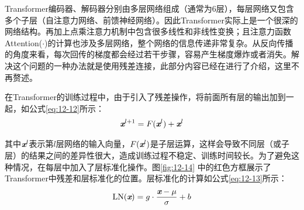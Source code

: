 \parinterval Transformer编码器、解码器分别由多层网络组成（通常为6层），每层网络又包含多个子层（自注意力网络、前馈神经网络）。因此Transformer实际上是一个很深的网络结构。再加上点乘注意力机制中包含很多线性和非线性变换；且注意力函数Attention($\cdot$)的计算也涉及多层网络，整个网络的信息传递非常复杂。从反向传播的角度来看，每次回传的梯度都会经过若干步骤，容易产生梯度爆炸或者消失。解决这个问题的一种办法就是使用残差连接，此部分内容已经在{\chapternine}进行了介绍，这里不再赘述。


%



\parinterval 在Transformer的训练过程中，由于引入了残差操作，将前面所有层的输出加到一起，如公式\eqref{eq:12-12}所示：
\begin{eqnarray}
\textbf{\em x}^{l+1} = F (\textbf{\em x}^l) + \textbf{\em x}^l
\label{eq:12-12}
\end{eqnarray}

\noindent 其中$\textbf{\em x}^l$表示第$l$层网络的输入向量，$F (\textbf{\em x}^l)$是子层运算，这样会导致不同层（或子层）的结果之间的差异性很大，造成训练过程不稳定、训练时间较长。为了避免这种情况，在每层中加入了层标准化操作。图\ref{fig:12-14} 中的红色方框展示了Transformer中残差和层标准化的位置。层标准化的计算如公式\eqref{eq:12-13}所示：
\begin{eqnarray}
\textrm{LN}(\textbf{\em x}) = g \cdot \frac{\textbf{\em x}- \mu} {\sigma} + b
\label{eq:12-13}
\end{eqnarray}
\vspace{-2em}

